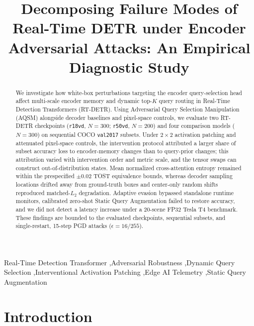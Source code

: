 \documentclass[preprint,10pt]{elsarticle}
\begin{document}
\begin{frontmatter}

\title{Decomposing Failure Modes of Real-Time DETR under Encoder Adversarial Attacks: An Empirical Diagnostic Study}

\begin{abstract}
We investigate how white-box perturbations targeting the encoder query-selection head affect multi-scale encoder memory and dynamic top-$K$ query routing in Real-Time Detection Transformers (RT-DETR). Using Adversarial Query Selection Manipulation (AQSM) alongside decoder baselines and pixel-space controls, we evaluate two RT-DETR checkpoints (\texttt{r18vd}, $N = 300$; \texttt{r50vd}, $N = 200$) and four comparison models ($N = 300$) on sequential COCO \texttt{val2017} subsets. Under $2 \times 2$ activation patching and attenuated pixel-space controls, the intervention protocol attributed a larger share of subset accuracy loss to encoder-memory changes than to query-prior changes; this attribution varied with intervention order and metric scale, and the tensor swaps can construct out-of-distribution states. Mean normalized cross-attention entropy remained within the prespecified $\pm 0.02$ TOST equivalence bounds, whereas decoder sampling locations drifted away from ground-truth boxes and center-only random shifts reproduced matched-$L_2$ degradation. Adaptive evasion bypassed standalone runtime monitors, calibrated zero-shot Static Query Augmentation failed to restore accuracy, and we did not detect a latency increase under a 20-scene FP32 Tesla T4 benchmark. These findings are bounded to the evaluated checkpoints, sequential subsets, and single-restart, 15-step PGD attacks ($\epsilon = 16/255$).
\end{abstract}

\begin{keyword}
Real-Time Detection Transformer \sep Adversarial Robustness \sep Dynamic Query Selection \sep Interventional Activation Patching \sep Edge AI Telemetry \sep Static Query Augmentation
\end{keyword}

\end{frontmatter}


\section{Introduction}
\label{sec:introduction}
\end{document}
